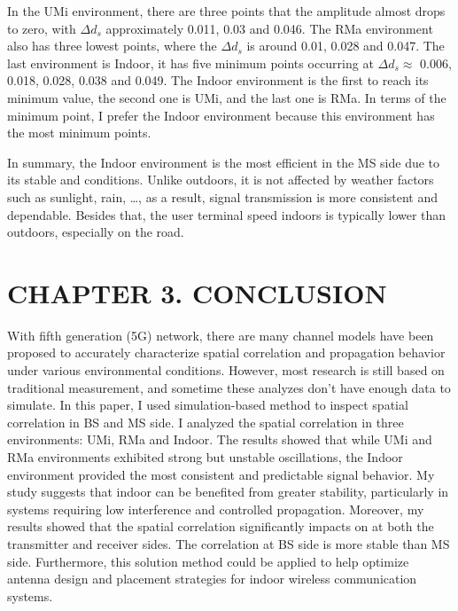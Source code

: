 \documentclass{article} %
\begin{document}
In the UMi environment, there are three points that the amplitude almost drops to zero, with $\Delta d_s$ approximately 0.011, 0.03 and 0.046. The RMa environment also has three lowest points, where the $\Delta d_s$ is around 0.01, 0.028 and 0.047. The last environment is Indoor, it has five minimum points occurring at $\Delta d_s \approx$ 0.006, 0.018, 0.028, 0.038 and 0.049. The Indoor environment is the first to reach its minimum value, the second one is UMi, and the last one is RMa. In terms of the minimum point, I prefer the Indoor environment because this environment has the most minimum points.

In summary, the Indoor environment is the most efficient in the MS side due to its stable and conditions. Unlike outdoors, it is not affected by weather factors such as sunlight, rain, \dots, as a result, signal transmission is more consistent and dependable. Besides that, the user terminal speed indoors is typically lower than outdoors, especially on the road.

\clearpage

\section*{CHAPTER 3. CONCLUSION}
With fifth generation (5G) network, there are many channel models have been proposed to accurately characterize spatial correlation and propagation behavior under various environmental conditions. However, most research is still based on traditional measurement, and sometime these analyzes don’t have enough data to simulate. In this paper, I used simulation-based method to inspect spatial correlation in BS and MS side. I analyzed the spatial correlation in three environments: UMi, RMa and Indoor. The results showed that while UMi and RMa environments exhibited strong but unstable oscillations, the Indoor environment provided the most consistent and predictable signal behavior. My study suggests that indoor can be benefited from greater stability, particularly in systems requiring low interference and controlled propagation. Moreover, my results showed that the spatial correlation significantly impacts on at both the transmitter and receiver sides. The correlation at BS side is more stable than MS side. Furthermore, this solution method could be applied to help optimize antenna design and placement strategies for indoor wireless communication systems.

\clearpage



\end{document}
